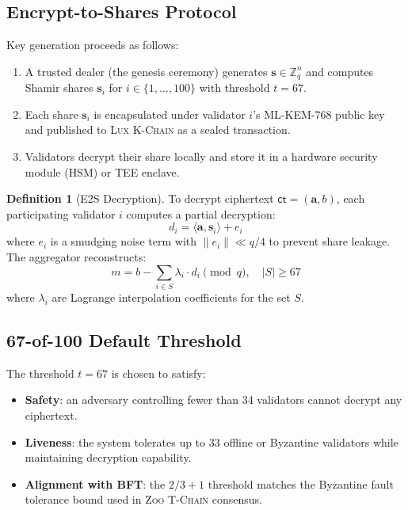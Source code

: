 \documentclass[11pt,letterpaper]{article}
\theoremstyle{definition}
\newtheorem{definition}{Definition}
\theoremstyle{remark}
\newcommand{\Zoo}{\textsc{Zoo}}
\newcommand{\Lux}{\textsc{Lux}}
\newcommand{\TChain}{\textsc{T-Chain}}
\newcommand{\KChain}{\textsc{K-Chain}}
\newcommand{\MLKEM}{\textsc{ML-KEM}}
\begin{document}
\subsection{Encrypt-to-Shares Protocol}

Key generation proceeds as follows:

\begin{enumerate}
  \item A trusted dealer (the genesis ceremony) generates $\mathbf{s} \in \mathbb{Z}_q^n$ and computes Shamir shares $\mathbf{s}_i$ for $i \in \{1, \ldots, 100\}$ with threshold $t = 67$.
  \item Each share $\mathbf{s}_i$ is encapsulated under validator $i$'s \MLKEM{}-768 public key and published to \Lux{} \KChain{} as a sealed transaction.
  \item Validators decrypt their share locally and store it in a hardware security module (HSM) or TEE enclave.
\end{enumerate}

\begin{definition}[E2S Decryption]
To decrypt ciphertext $\mathsf{ct} = (\mathbf{a}, b)$, each participating validator $i$ computes a partial decryption:
\begin{equation}
  d_i = \langle \mathbf{a}, \mathbf{s}_i \rangle + e_i
\end{equation}
where $e_i$ is a smudging noise term with $\|e_i\| \ll q/4$ to prevent share leakage. The aggregator reconstructs:
\begin{equation}
  m = b - \sum_{i \in S} \lambda_i \cdot d_i \pmod{q}, \quad |S| \geq 67
\end{equation}
where $\lambda_i$ are Lagrange interpolation coefficients for the set $S$.
\end{definition}

\subsection{67-of-100 Default Threshold}

The threshold $t = 67$ is chosen to satisfy:

\begin{itemize}
  \item \textbf{Safety}: an adversary controlling fewer than 34 validators cannot decrypt any ciphertext.
  \item \textbf{Liveness}: the system tolerates up to 33 offline or Byzantine validators while maintaining decryption capability.
  \item \textbf{Alignment with BFT}: the $2/3 + 1$ threshold matches the Byzantine fault tolerance bound used in \Zoo{} \TChain{} consensus.
\end{itemize}
\end{document}
